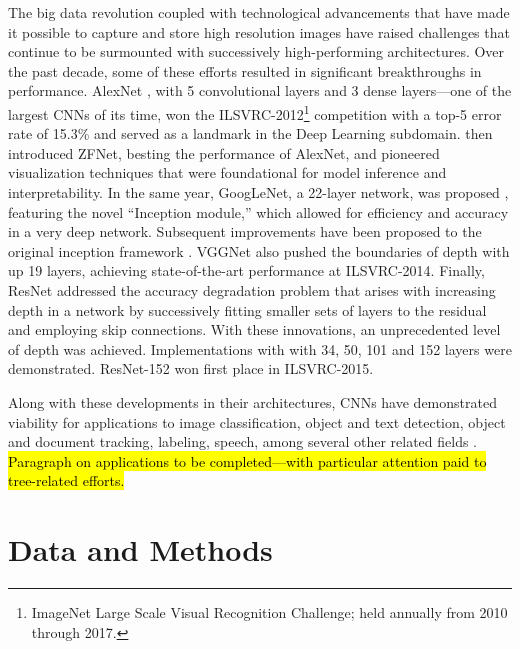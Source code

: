 \documentclass[Journal, letterpaper]{ascelike-new}
\newcommand{\?}{\stackrel{?}{=}}
\begin{document}
The big data revolution coupled with technological advancements that have made it possible to capture and store high resolution images have raised challenges that continue to be surmounted with successively high-performing
architectures. Over the past decade, some of these efforts resulted in significant breakthroughs in performance. AlexNet \cite{krizhevsky2012imageneta}, with 5 convolutional layers and 3 dense layers---one of the largest CNNs of its time, won the ILSVRC-2012\footnote{ImageNet Large Scale Visual Recognition Challenge; held annually from 2010 through 2017.} competition with a top-5 error rate of 15.3\% and served as a landmark in the Deep Learning subdomain.  then introduced ZFNet, besting the performance of AlexNet, and pioneered visualization techniques that were foundational for model inference and interpretability.  In the same year, GoogLeNet, a 22-layer network, was proposed \cite{szegedy2014going}, featuring the novel ``Inception module,'' which allowed for efficiency and accuracy in a very deep network. Subsequent improvements have been proposed to the original inception framework \cite{szegedy2015rethinking,szegedy2016inceptionv4}.  VGGNet \cite{simonyan2015very} also pushed the boundaries of depth with up 19 layers, achieving state-of-the-art performance at ILSVRC-2014. Finally, ResNet \cite{he2015deep} addressed the accuracy degradation problem that arises with increasing depth in a network by successively fitting smaller sets of layers to the residual and employing skip connections. With these innovations, an unprecedented level of depth was achieved. Implementations with with 34, 50, 101 and 152 layers were demonstrated. ResNet-152 won first place in ILSVRC-2015.

Along with these developments in their architectures, CNNs have demonstrated viability for applications to image
classification, object and text detection, object and document tracking, labeling, speech, among several other related
fields \cite{gu2018recent}. \hl{Paragraph on applications to be completed---with particular attention paid to tree-related efforts.}


\section{Data and Methods}
\end{document}
